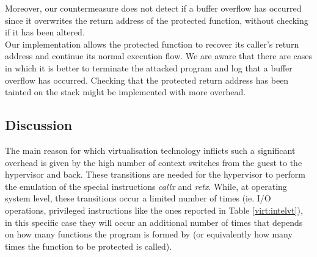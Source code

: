 
Moreover, our countermeasure does not detect if a buffer overflow has occurred since it overwrites the return address of the protected function, without checking if it has been altered.\\
Our implementation allows the protected function to recover its caller's return address and continue its normal execution flow. We are aware that there are cases in which it is better to terminate the attacked program and log that a buffer overflow has occurred. Checking that the protected return address has been tainted on the stack might be implemented with more overhead.\\

\subsection{Discussion}
The main reason for which virtualisation technology inflicts such a significant overhead is given by the high number of context switches from the guest to the hypervisor and back. These transitions are needed for the hypervisor to perform the emulation of the special instructions \emph{callx} and \emph{retx}. 
While, at operating system level, these transitions occur a limited number of times (ie. I/O operations, privileged instructions like the ones reported in Table \ref{virt:intelvt}), in this specific case they will occur an additional number of times that depends on how many functions the program is formed by (or equivalently how many times the function to be protected is called). 

